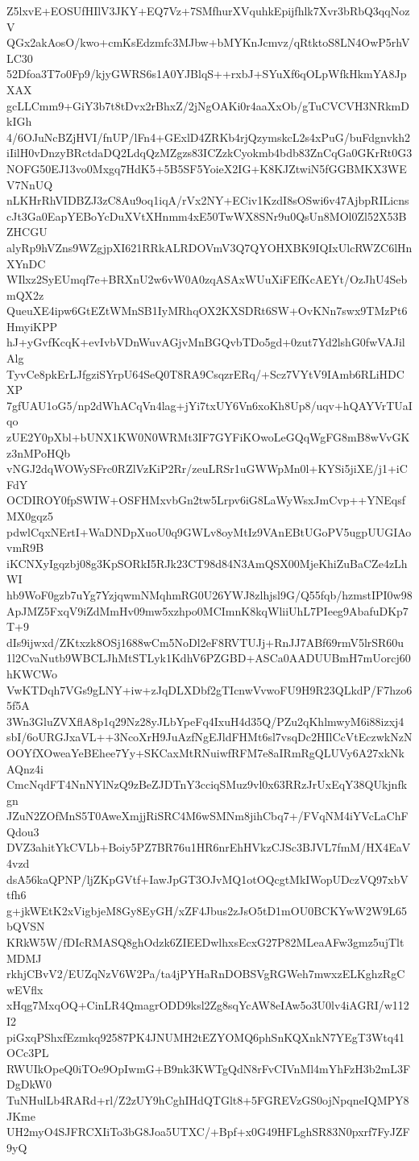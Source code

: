 Z5lxvE+EOSUfHIlV3JKY+EQ7Vz+7SMfhurXVquhkEpijfhlk7Xvr3bRbQ3qqNozV
QGx2akAosO/kwo+cmKsEdzmfc3MJbw+bMYKnJcmvz/qRtktoS8LN4OwP5rhVLC30
52Dfoa3T7o0Fp9/kjyGWRS6s1A0YJBlqS++rxbJ+SYuXf6qOLpWfkHkmYA8JpXAX
gcLLCmm9+GiY3b7t8tDvx2rBhxZ/2jNgOAKi0r4aaXxOb/gTuCVCVH3NRkmDkIGh
4/6OJuNcBZjHVI/fnUP/lFn4+GExlD4ZRKb4rjQzymskcL2s4xPuG/buFdgnvkh2
iIilH0vDnzyBRctdaDQ2LdqQzMZgzs83ICZzkCyokmb4bdb83ZnCqGa0GKrRt0G3
NOFG50EJ13vo0Mxgq7HdK5+5B5SF5YoieX2IG+K8KJZtwiN5fGGBMKX3WEV7NnUQ
nLKHrRhVIDBZJ3zC8Au9oq1iqA/rVx2NY+ECiv1KzdI8sOSwi6v47AjbpRILicns
cJt3Ga0EapYEBoYcDuXVtXHnmm4xE50TwWX8SNr9u0QsUn8MOl0Zl52X53BZHCGU
alyRp9hVZns9WZgjpXI621RRkALRDOVmV3Q7QYOHXBK9IQIxUlcRWZC6lHnXYnDC
WIlxz2SyEUmqf7e+BRXnU2w6vW0A0zqASAxWUuXiFEfKcAEYt/OzJhU4SebmQX2z
QueuXE4ipw6GtEZtWMnSB1IyMRhqOX2KXSDRt6SW+OvKNn7swx9TMzPt6HmyiKPP
hJ+yGvfKcqK+evIvbVDnWuvAGjvMnBGQvbTDo5gd+0zut7Yd2lshG0fwVAJilAlg
TyvCe8pkErLJfgziSYrpU64SeQ0T8RA9CsqzrERq/+Scz7VYtV9IAmb6RLiHDCXP
7gfUAU1oG5/np2dWhACqVn4lag+jYi7txUY6Vn6xoKh8Up8/uqv+hQAYVrTUaIqo
zUE2Y0pXbl+bUNX1KW0N0WRMt3IF7GYFiKOwoLeGQqWgFG8mB8wVvGKz3nMPoHQb
vNGJ2dqWOWySFrc0RZlVzKiP2Rr/zeuLRSr1uGWWpMn0l+KYSi5jiXE/j1+iCFdY
OCDIROY0fpSWIW+OSFHMxvbGn2tw5Lrpv6iG8LaWyWsxJmCvp++YNEqsfMX0gqz5
pdwlCqxNErtI+WaDNDpXuoU0q9GWLv8oyMtIz9VAnEBtUGoPV5ugpUUGIAovmR9B
iKCNXyIgqzbj08g3KpSORkI5RJk23CT98d84N3AmQSX00MjeKhiZuBaCZe4zLhWI
hb9WoF0gzb7uYg7YzjqwmNMqhmRG0U26YWJ8zlhjsl9G/Q55fqb/hzmstIPI0w98
ApJMZ5FxqV9iZdMmHv09mw5xzhpo0MCImnK8kqWliiUhL7PIeeg9AbafuDKp7T+9
dIs9ijwxd/ZKtxzk8OSj1688wCm5NoDl2eF8RVTUJj+RnJJ7ABf69rmV5lrSR60u
1l2CvaNutb9WBCLJhMtSTLyk1KdhV6PZGBD+ASCa0AADUUBmH7mUorcj60hKWCWo
VwKTDqh7VGs9gLNY+iw+zJqDLXDbf2gTIcnwVvwoFU9H9R23QLkdP/F7hzo65f5A
3Wn3GluZVXflA8p1q29Nz28yJLbYpeFq4IxuH4d35Q/PZu2qKhlmwyM6i88izxj4
sbI/6oURGJxaVL++3NcoXrH9JuAzfNgEJldFHMt6sl7vsqDc2HIlCcVtEczwkNzN
OOYfXOweaYeBEhee7Yy+SKCaxMtRNuiwfRFM7e8aIRmRgQLUVy6A27xkNkAQnz4i
CmcNqdFT4NnNYlNzQ9zBeZJDTnY3cciqSMuz9vl0x63RRzJrUxEqY38QUkjnfkgn
JZuN2ZOfMnS5T0AweXmjjRiSRC4M6wSMNm8jihCbq7+/FVqNM4iYVcLaChFQdou3
DVZ3ahitYkCVLb+Boiy5PZ7BR76u1HR6nrEhHVkzCJSc3BJVL7fmM/HX4EaV4vzd
dsA56kaQPNP/ljZKpGVtf+IawJpGT3OJvMQ1otOQcgtMkIWopUDczVQ97xbVtfh6
g+jkWEtK2xVigbjeM8Gy8EyGH/xZF4Jbus2zJsO5tD1mOU0BCKYwW2W9L65bQVSN
KRkW5W/fDIcRMASQ8ghOdzk6ZIEEDwlhxsEcxG27P82MLeaAFw3gmz5ujTltMDMJ
rkhjCBvV2/EUZqNzV6W2Pa/ta4jPYHaRnDOBSVgRGWeh7mwxzELKghzRgCwEVflx
xHqg7MxqOQ+CinLR4QmagrODD9ksl2Zg8sqYcAW8eIAw5o3U0lv4iAGRI/w112I2
piGxqPShxfEzmkq92587PK4JNUMH2tEZYOMQ6phSnKQXnkN7YEgT3Wtq41OCc3PL
RWUIkOpeQ0iTOe9OpIwmG+B9nk3KWTgQdN8rFvCIVnMl4mYhFzH3b2mL3FDgDkW0
TuNHulLb4RARd+rl/Z2zUY9hCghIHdQTGlt8+5FGREVzGS0ojNpqneIQMPY8JKme
UH2myO4SJFRCXIiTo3bG8Joa5UTXC/+Bpf+x0G49HFLghSR83N0pxrf7FyJZF9yQ
